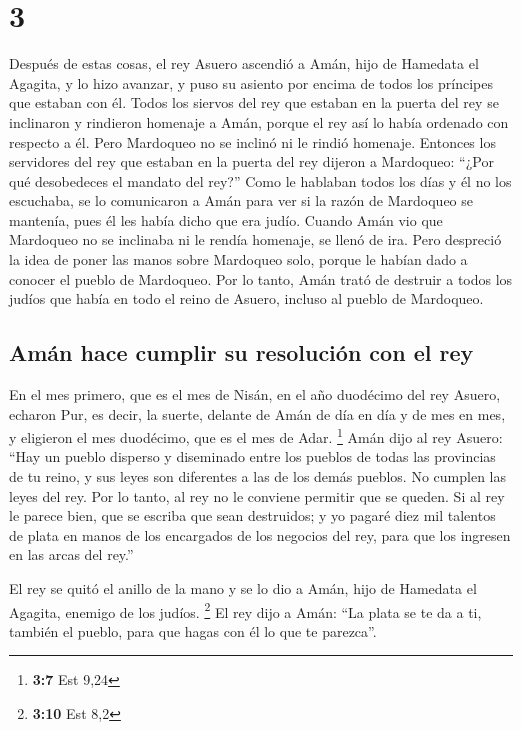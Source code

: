 \hypertarget{section-2}{%
\section{3}\label{section-2}}

 Después de estas cosas, el rey Asuero ascendió a Amán,
hijo de Hamedata el Agagita, y lo hizo avanzar, y puso su asiento por
encima de todos los príncipes que estaban con él.  Todos
los siervos del rey que estaban en la puerta del rey se inclinaron y
rindieron homenaje a Amán, porque el rey así lo había ordenado con
respecto a él. Pero Mardoqueo no se inclinó ni le rindió homenaje.
 Entonces los servidores del rey que estaban en la puerta
del rey dijeron a Mardoqueo: ``¿Por qué desobedeces el mandato del
rey?''  Como le hablaban todos los días y él no los
escuchaba, se lo comunicaron a Amán para ver si la razón de Mardoqueo se
mantenía, pues él les había dicho que era judío.  Cuando
Amán vio que Mardoqueo no se inclinaba ni le rendía homenaje, se llenó
de ira.  Pero despreció la idea de poner las manos sobre
Mardoqueo solo, porque le habían dado a conocer el pueblo de Mardoqueo.
Por lo tanto, Amán trató de destruir a todos los judíos que había en
todo el reino de Asuero, incluso al pueblo de Mardoqueo.

\hypertarget{amuxe1n-hace-cumplir-su-resoluciuxf3n-con-el-rey}{%
\subsection{Amán hace cumplir su resolución con el
rey}\label{amuxe1n-hace-cumplir-su-resoluciuxf3n-con-el-rey}}

 En el mes primero, que es el mes de Nisán, en el año
duodécimo del rey Asuero, echaron Pur, es decir, la suerte, delante de
Amán de día en día y de mes en mes, y eligieron el mes duodécimo, que es
el mes de Adar. \footnote{\textbf{3:7} Est 9,24}  Amán
dijo al rey Asuero: ``Hay un pueblo disperso y diseminado entre los
pueblos de todas las provincias de tu reino, y sus leyes son diferentes
a las de los demás pueblos. No cumplen las leyes del rey. Por lo tanto,
al rey no le conviene permitir que se queden.  Si al rey
le parece bien, que se escriba que sean destruidos; y yo pagaré diez mil
talentos de plata en manos de los encargados de los negocios del rey,
para que los ingresen en las arcas del rey.''

 El rey se quitó el anillo de la mano y se lo dio a Amán,
hijo de Hamedata el Agagita, enemigo de los judíos. \footnote{\textbf{3:10}
  Est 8,2}  El rey dijo a Amán: ``La plata se te da a ti,
también el pueblo, para que hagas con él lo que te parezca''.

